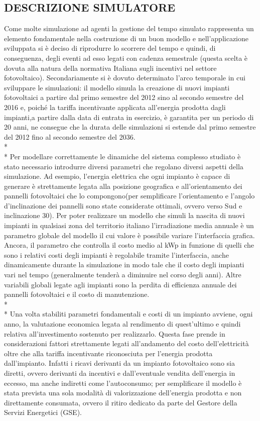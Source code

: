 \documentclass[12pt,a4paper,openright,twoside]{report}
\begin{document}
\subsection{DESCRIZIONE SIMULATORE}
Come molte simulazione ad agenti la gestione del tempo simulato rappresenta un elemento fondamentale nella costruzione di un buon modello e nell'applicazione sviluppata si è deciso di riprodurre lo scorrere del tempo e quindi, di conseguenza, degli eventi ad esso legati con cadenza semestrale (questa scelta è dovuta alla natura della normativa Italiana sugli incentivi nel settore fotovoltaico). Secondariamente si è dovuto determinato l'arco temporale in cui sviluppare le simulazioni: il modello simula la creazione di nuovi impianti fotovoltaici a partire dal primo semestre del 2012 sino al secondo semestre del 2016 e, poiché la tariffa incentivante applicata all'energia prodotta dagli impianti,a partire dalla data di entrata in esercizio, è garantita per un periodo di 20 anni, ne consegue che la durata delle simulazioni si estende dal primo semestre del 2012 fino al secondo semestre del 2036.
\\* \\*
Per modellare correttamente le dinamiche del sistema complesso studiato è stato necessario introdurre diversi parametri che regolano diversi aspetti della simulazione. Ad esempio, l'energia elettrica che ogni impianto è capace di generare è strettamente legata alla posizione geografica e all'orientamento dei pannelli fotovoltaici che lo compongono(per semplificare l'orientamento e l'angolo d'inclinazione dei pannelli sono state considerate ottimali, ovvero verso Sud e inclinazione 30\textdegree). Per poter realizzare un modello che simuli la nascita di nuovi impianti in qualsiasi zona del territorio italiano l'irradiazione media annuale è un parametro globale del modello il cui valore è possibile variare l'interfaccia grafica. Ancora, il parametro che controlla il costo medio al kWp in funzione di quelli che sono i relativi costi degli impianti è regolabile tramite l'interfaccia, anche dinamicamente durante la simulazione in modo tale che il costo degli impianti vari nel tempo (generalmente tenderà a diminuire nel corso degli anni). Altre variabili globali legate agli impianti sono la perdita di efficienza annuale dei pannelli fotovoltaici e il costo di manutenzione.
\\* \\*
Una volta stabiliti parametri fondamentali e costi di un impianto avviene, ogni anno, la valutazione economica legata al rendimento di quest'ultimo e quindi relativa all'investimento sostenuto per realizzarlo. Questa fase prende in considerazioni fattori strettamente legati all'andamento del costo dell'elettricità oltre che alla tariffa incentivante riconosciuta per l'energia prodotta dall'impianto. Infatti i ricavi derivanti da un impianto fotovoltaico sono sia diretti, ovvero derivanti da incentivi e dall'eventuale vendita dell'energia in eccesso, ma anche indiretti come l'autoconsumo; per semplificare il modello è stata prevista una sola modalità di valorizzazione dell'energia prodotta e non direttamente consumata, ovvero il ritiro dedicato da parte del Gestore della Servizi Energetici (GSE).
\end{document}
